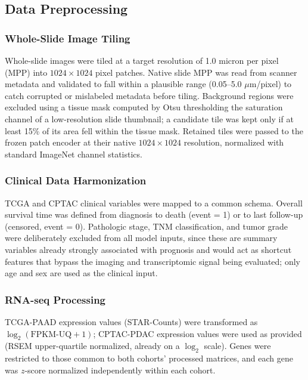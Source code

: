 %

\subsection{Data Preprocessing}
\label{subsec:preprocessing}

\subsubsection{Whole-Slide Image Tiling}

Whole-slide images were tiled at a target resolution of 1.0 micron per pixel
(MPP) into $1024 \times 1024$ pixel patches. Native slide MPP was read from
scanner metadata and validated to fall within a plausible range (0.05--5.0
$\mu$m/pixel) to catch corrupted or mislabeled metadata before tiling.
Background regions were excluded using a tissue mask computed by Otsu
thresholding the saturation channel of a low-resolution slide thumbnail; a
candidate tile was kept only if at least 15\% of its area fell within the
tissue mask. Retained tiles were passed to the frozen patch encoder at their
native $1024\times1024$ resolution, normalized with standard ImageNet channel
statistics.

\subsubsection{Clinical Data Harmonization}

TCGA and CPTAC clinical variables were mapped to a common schema. Overall
survival time was defined from diagnosis to death (event = 1) or to last
follow-up (censored, event = 0). Pathologic stage, TNM classification, and
tumor grade were deliberately excluded from all model inputs, since these are
summary variables already strongly associated with prognosis and would act as
shortcut features that bypass the imaging and transcriptomic signal being
evaluated; only age and sex are used as the clinical input.

\subsubsection{RNA-seq Processing}

TCGA-PAAD expression values (STAR-Counts) were transformed as
$\log_2(\text{FPKM-UQ} + 1)$; CPTAC-PDAC expression values were used as
provided (RSEM upper-quartile normalized, already on a $\log_2$ scale). Genes
were restricted to those common to both cohorts' processed matrices, and each
gene was $z$-score normalized independently within each cohort.

